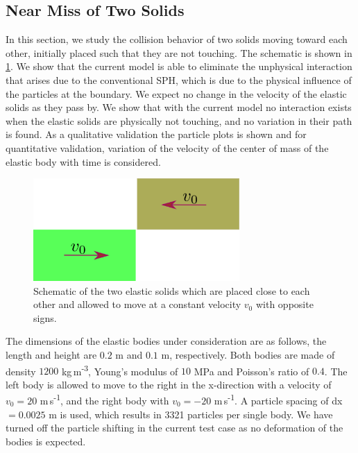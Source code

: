 \subsection{Near Miss of Two Solids}
\label{sec:results-two-solids-passing-by}
In this section, we study the collision behavior of two solids moving toward
each other, initially placed such that they are not touching. The schematic is
shown in \cref{fig:results-solid-passing-by-schematic}. We show that the current
model is able to eliminate the unphysical interaction that arises due to the
conventional SPH, which is due to the physical influence of the particles at the
boundary. We expect no change in the velocity of the elastic solids as they pass
by. We show that with the current model no interaction exists when the elastic
solids are physically not touching, and no variation in their path is found. As
a qualitative validation the particle plots is shown and for quantitative
validation, variation of the velocity of the center of mass of the elastic body
with time is considered.

\begin{figure}[!htpb]
  \centering
  \includegraphics[width=0.7\textwidth]{images/csph/images/dinesh_2022_elastic_solids_passing_by/schematic}
  \caption{Schematic of the two elastic solids which are placed close to each
    other and allowed to move at a constant velocity $v_0$ with opposite signs.}
\label{fig:results-solid-passing-by-schematic}
\end{figure}
The dimensions of the elastic bodies under consideration are as follows, the
length and height are $0.2$ m and $0.1$ m, respectively. Both bodies are made
of density $1200$ kg\,m\textsuperscript{-3}, Young's modulus of $10$ MPa and
Poisson's ratio of $0.4$. The left body is allowed to
move to the right in the x-direction with a velocity of $v_0=20$
m\,s\textsuperscript{-1}, and the right body with $v_0=-20$
m\,s\textsuperscript{-1}. A particle spacing of dx $=0.0025$ m is used, which
results in 3321 particles per single body. We have turned off the particle
shifting in the current test case as no deformation of the bodies is expected.

